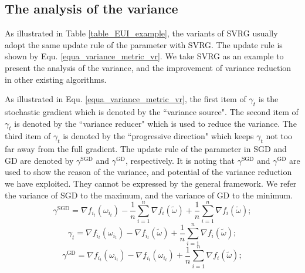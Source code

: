 \documentclass[letterpaper]{article}
\begin{document}
\subsection{The analysis of the variance}
\label{subsect_variance_analysis}
As illustrated  in Table \ref{table_EUI_example},  the variants of SVRG  usually adopt the same update rule of the parameter with SVRG. The update rule is shown by Equ. \ref{equa_variance_metric_vr}. We take SVRG  as an example to present the analysis of the variance, and the improvement of variance reduction in other existing algorithms.

As illustrated in Equ. \ref{equa_variance_metric_vr}, the first item of $\gamma_t$ is the stochastic gradient which is denoted by the ``variance source". The second item of $\gamma_t$ is denoted by the ``variance reducer" which is used to reduce the variance. The third item of $\gamma_t$ is denoted by the ``progressive direction" which keeps $\gamma_t$ not too far away from the full gradient. The update rule of the parameter in SGD and GD are denoted by $\gamma^{\text{SGD}}$ and $\gamma^{\text{GD}}$, respectively. It is noting that $\gamma^{\text{SGD}}$ and $\gamma^{\text{GD}}$ are used to show the reason of the variance, and potential of the variance reduction we have exploited. They cannot be expressed by the general framework.  We refer the variance of SGD to the maximum, and  the variance of GD to the minimum. 
\begin{equation}
\label{equa_variance_metric_sgd}
 \gamma^{\text{SGD}}=\nabla f_{i_t}(\omega_{i_t})-\frac{1}{n}\sum\limits_{i=1}^n\nabla f_i(\tilde{\omega})+\frac{1}{n}\sum\limits_{i=1}^n\nabla f_i(\tilde{\omega});
\end{equation}
\begin{equation}
\label{equa_variance_metric_vr}
\gamma_t=\nabla f_{i_t}(\omega_{i_t})-\nabla f_{i_t}(\tilde{\omega})+\frac{1}{n}\sum\limits_{i=1}^n\nabla f_i(\tilde{\omega});
\end{equation}
\begin{equation}
\label{equa_variance_metric_gd}
\gamma^{\text{GD}}=\nabla f_{i_t}(\omega_{i_t})-\nabla f_{i_t}(\omega_{i_t})+\frac{1}{n}\sum\limits_{i=1}^n\nabla f_i(\tilde{\omega});
\end{equation}
\end{document}
